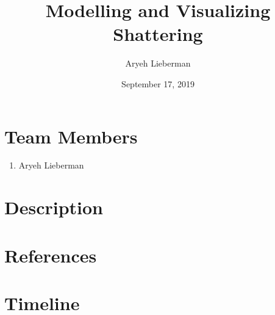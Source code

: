 \documentclass{article}
\author{Aryeh Lieberman}
\title{Modelling and Visualizing Shattering}
\date{September 17, 2019}
\begin{document}
\maketitle
\section{Team Members}
\begin{enumerate}
	\item Aryeh Lieberman
\end{enumerate}
\section{Description}
\section{References}
\nocite{*}
{}

\section{Timeline}
\end{document}

